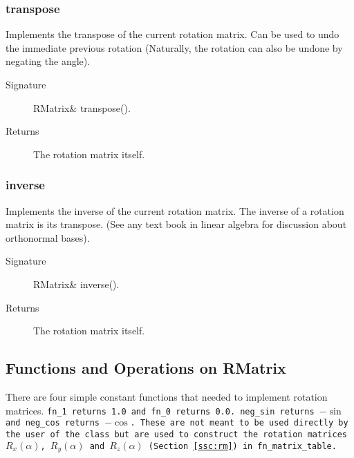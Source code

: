 \subsubsection{transpose}
Implements the transpose of the current rotation matrix. Can be used to undo
the immediate previous rotation (Naturally, the rotation can also be undone
by negating the angle).
    
    \begin{description}
         \item [Signature] RMatrix\& transpose().
       \item [Returns] The rotation matrix itself.
    \end{description} 

\subsubsection{inverse}
Implements the inverse of the current rotation matrix. The inverse
of a rotation matrix is its transpose. (See any text book in linear algebra 
for discussion about orthonormal bases).

    \begin{description}
       \item [Signature] RMatrix\& inverse(). 
       \item [Returns] The rotation matrix itself.
    \end{description} 

\subsection{Functions and Operations on RMatrix}
There  are four  simple constant  functions that  needed  to implement
rotation matrices. \tt fn\_1 \rm returns 1.0 and \tt fn\_0 \rm returns
0.0. \tt  neg\_sin \rm returns  $-\sin$ and  \tt neg\_cos  \rm returns
$-\cos$.  These are  not meant to be used directly by  the user of the
class but are used to construct the rotation matrices $R_{x}(\alpha)$,
$R_{y}(\alpha)$ and $R_{z}(\alpha)$ (Section
\ref{ssc:rm}) in \tt fn\_matrix\_table\rm.
 
